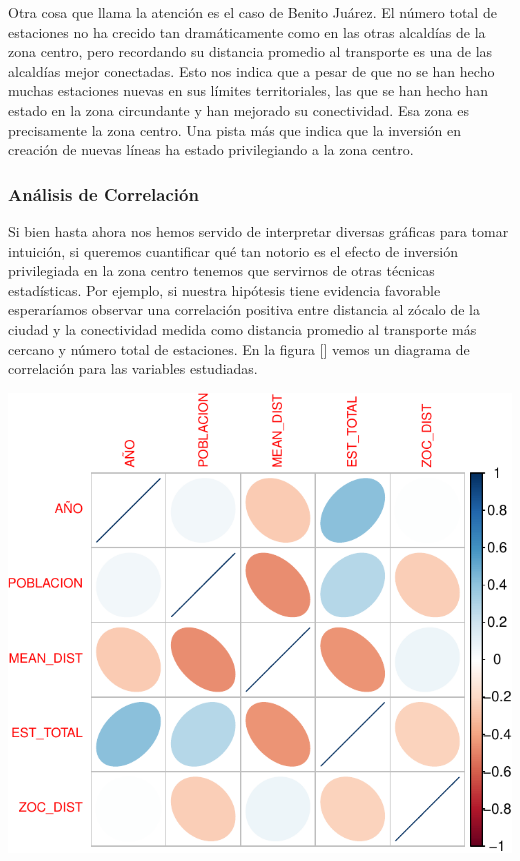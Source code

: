 \documentclass[
  spanish,
]{article}
\begin{document}
Otra cosa que llama la atención es el caso de Benito Juárez. El número
total de estaciones no ha crecido tan dramáticamente como en las otras
alcaldías de la zona centro, pero recordando su distancia promedio al
transporte es una de las alcaldías mejor conectadas. Esto nos indica que
a pesar de que no se han hecho muchas estaciones nuevas en sus límites
territoriales, las que se han hecho han estado en la zona circundante y
han mejorado su conectividad. Esa zona es precisamente la zona centro.
Una pista más que indica que la inversión en creación de nuevas líneas
ha estado privilegiando a la zona centro.

\hypertarget{anuxe1lisis-de-correlaciuxf3n}{%
\subsubsection{Análisis de
Correlación}\label{anuxe1lisis-de-correlaciuxf3n}}

Si bien hasta ahora nos hemos servido de interpretar diversas gráficas
para tomar intuición, si queremos cuantificar qué tan notorio es el
efecto de inversión privilegiada en la zona centro tenemos que servirnos
de otras técnicas estadísticas. Por ejemplo, si nuestra hipótesis tiene
evidencia favorable esperaríamos observar una correlación positiva entre
distancia al zócalo de la ciudad y la conectividad medida como distancia
promedio al transporte más cercano y número total de estaciones. En la
figura {[}{]} vemos un diagrama de correlación para las variables
estudiadas.

\begin{center}\includegraphics{proyecto_files/figure-latex/unnamed-chunk-10-1} \end{center}
\end{document}

